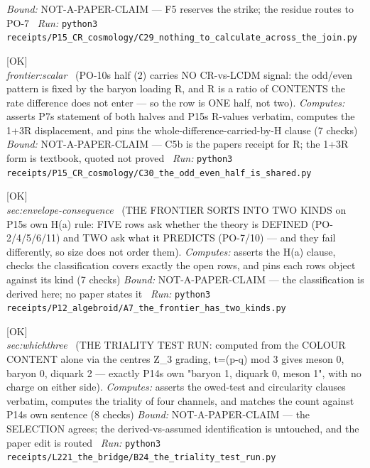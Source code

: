 \begin{description}
 \emph{Bound:} NOT-A-PAPER-CLAIM --- F5 reserves the strike; the residue routes to PO-7
\ \emph{Run:} \texttt{python3 receipts/P15\_CR\_cosmology/C29\_nothing\_to\_calculate\_across\_the\_join.py}
\item[\label{rcpt:C30_the_odd_even_half_is_shared}\texttt{C30\_the\_odd\_even\_half\_is\_shared}]\hfill\textsf{[OK]}\\
\textit{frontier:scalar} \ (PO-10s half (2) carries NO CR-vs-LCDM signal: the odd/even pattern is fixed by the baryon loading R, and R is a ratio of CONTENTS the rate difference does not enter --- so the row is ONE half, not two). 
\emph{Computes:} asserts P7s statement of both halves and P15s R-values verbatim, computes the 1+3R displacement, and pins the whole-difference-carried-by-H clause (7 checks)
 \emph{Bound:} NOT-A-PAPER-CLAIM --- C5b is the papers receipt for R; the 1+3R form is textbook, quoted not proved
\ \emph{Run:} \texttt{python3 receipts/P15\_CR\_cosmology/C30\_the\_odd\_even\_half\_is\_shared.py}
\item[\label{rcpt:A7_the_frontier_has_two_kinds}\texttt{A7\_the\_frontier\_has\_two\_kinds}]\hfill\textsf{[OK]}\\
\textit{sec:envelope-consequence} \ (THE FRONTIER SORTS INTO TWO KINDS on P15s own H(a) rule: FIVE rows ask whether the theory is DEFINED (PO-2/4/5/6/11) and TWO ask what it PREDICTS (PO-7/10) --- and they fail differently, so size does not order them). 
\emph{Computes:} asserts the H(a) clause, checks the classification covers exactly the open rows, and pins each rows object against its kind (7 checks)
 \emph{Bound:} NOT-A-PAPER-CLAIM --- the classification is derived here; no paper states it
\ \emph{Run:} \texttt{python3 receipts/P12\_algebroid/A7\_the\_frontier\_has\_two\_kinds.py}
\item[\label{rcpt:B24_the_triality_test_run}\texttt{B24\_the\_triality\_test\_run}]\hfill\textsf{[OK]}\\
\textit{sec:whichthree} \ (THE TRIALITY TEST RUN: computed from the COLOUR CONTENT alone via the centres Z\_3 grading, t=(p-q) mod 3 gives meson 0, baryon 0, diquark 2 --- exactly P14s own "baryon 1, diquark 0, meson 1", with no charge on either side). 
\emph{Computes:} asserts the owed-test and circularity clauses verbatim, computes the triality of four channels, and matches the count against P14s own sentence (8 checks)
 \emph{Bound:} NOT-A-PAPER-CLAIM --- the SELECTION agrees; the derived-vs-assumed identification is untouched, and the paper edit is routed
\ \emph{Run:} \texttt{python3 receipts/L221\_the\_bridge/B24\_the\_triality\_test\_run.py}

\end{description}

